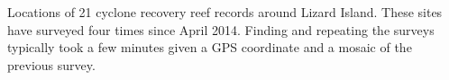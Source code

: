 Locations of 21 cyclone recovery reef records around Lizard Island. These sites have surveyed four times since April 2014. Finding and repeating the surveys typically took a few minutes given a GPS coordinate and a mosaic of the previous survey.
